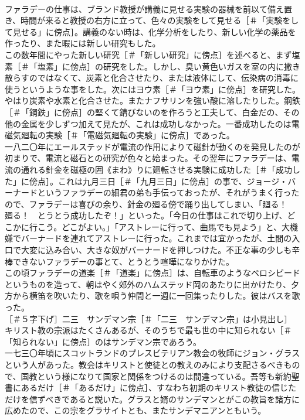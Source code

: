\documentclass[8pt]{extreport}
\begin{document}
\begin{CJK}{UTF8}{min}
\\	ファラデーの仕事は、ブランド教授が講義に見せる実験の器械を前以て備え置き、時間が来ると教授の右方に立って、色々の実験をして見せる［＃「実験をして見せる」に傍点］。講義のない時は、化学分析をしたり、新しい化学の薬品を作ったり、また暇には新しい研究もした。
\\	この数年間にやった新しい研究［＃「新しい研究」に傍点］を述べると、まず塩素［＃「塩素」に傍点］の研究をした。しかし、臭い黄色いガスを室の内に撒き散らすのではなくて、炭素と化合させたり、または液体にして、伝染病の消毒に使うというような事をした。次にはヨウ素［＃「ヨウ素」に傍点］を研究した。やはり炭素や水素と化合させた。またナフサリンを強い酸に溶したりした。鋼鉄［＃「鋼鉄」に傍点］の堅くて錆びないのを作ろうと工夫して、白金だの、その他の金属を少しずつ加えて見たが、これは成功しなかった。一番成功したのは電磁気廻転の実験［＃「電磁気廻転の実験」に傍点］であった。
\\	一八二〇年にエールステッドが電流の作用によりて磁針が動くのを発見したのが初まりで、電流と磁石との研究が色々と始まった。その翌年にファラデーは、電流の通れる針金を磁極の囲《まわ》りに廻転させる実験に成功した［＃「成功した」に傍点］。これは九月三日［＃「九月三日」に傍点］の事で、ジョージ・バーナードというファラデーの細君の弟も手伝っておったが、それがうまく行ったので、ファラデーは喜びの余り、針金の廻る傍で踊り出してしまい、「廻る！　廻る！　とうとう成功したぞ！」といった。「今日の仕事はこれで切り上げ、どこかに行こう。どこがよい。」「アストレーに行って、曲馬でも見よう」と、大機嫌でバーナードを連れてアストレーに行った。これまでは宜かったが、土間の入口で大変に込み合い、大きな奴がバーナードを押しつけた。不正な事の少しも辛棒できないファラデーの事とて、とうとう喧嘩になりかけた。
\\	この頃ファラデーの道楽［＃「道楽」に傍点］は、自転車のようなベロシピードというものを造って、朝はやく郊外のハムステッド岡のあたりに出かけたり、夕方から横笛を吹いたり、歌を唄う仲間と一週に一回集ったりした。彼はバスを歌った。
\\	［＃５字下げ］二三　サンデマン宗［＃「二三　サンデマン宗」は小見出し］
\\	キリスト教の宗派はたくさんあるが、そのうちで最も世の中に知られない［＃「知られない」に傍点］のはサンデマン宗であろう。
\\	一七三〇年頃にスコットランドのプレスビテリアン教会の牧師にジョン・グラスという人があった。教会はキリストと使徒との教えのみにより支配さるべきもので、国教という様になりて国家と関係をつけるのは間違っている。吾等も新約聖書にあるだけ［＃「あるだけ」に傍点］、すなわち初期のキリスト教徒の信じただけを信ずべきであると説いた。グラスと婿のサンデマンとがこの教旨を諸方に広めたので、この宗をグラサイトとも、またサンデマニアンともいう。

\end{CJK}
\end{document}
